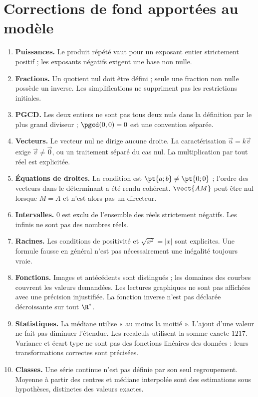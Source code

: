 \section*{Corrections de fond apportées au modèle}
\begin{enumerate}
\item \textbf{Puissances.} Le produit répété vaut pour un exposant entier strictement positif ; les exposants négatifs exigent une base non nulle.
\item \textbf{Fractions.} Un quotient nul doit être défini ; seule une fraction non nulle possède un inverse. Les simplifications ne suppriment pas les restrictions initiales.
\item \textbf{PGCD.} Les deux entiers ne sont pas tous deux nuls dans la définition par le plus grand diviseur ; $\pgcd(0,0)=0$ est une convention séparée.
\item \textbf{Vecteurs.} Le vecteur nul ne dirige aucune droite. La caractérisation $\vec u=k\vec v$ exige $\vec v\ne\vec0$, ou un traitement séparé du cas nul. La multiplication par tout réel est explicitée.
\item \textbf{Équations de droites.} La condition est $\pt{a;b}\ne\pt{0;0}$ ; l'ordre des vecteurs dans le déterminant a été rendu cohérent. $\vect{AM}$ peut être nul lorsque $M=A$ et n'est alors pas un directeur.
\item \textbf{Intervalles.} $0$ est exclu de l'ensemble des réels strictement négatifs. Les infinis ne sont pas des nombres réels.
\item \textbf{Racines.} Les conditions de positivité et $\sqrt{x^2}=|x|$ sont explicites. Une formule fausse en général n'est pas nécessairement une inégalité toujours vraie.
\item \textbf{Fonctions.} Images et antécédents sont distingués ; les domaines des courbes couvrent les valeurs demandées. Les lectures graphiques ne sont pas affichées avec une précision injustifiée. La fonction inverse n'est pas déclarée décroissante sur tout $\R^*$.
\item \textbf{Statistiques.} La médiane utilise « au moins la moitié ». L'ajout d'une valeur ne fait pas diminuer l'étendue. Les recalculs utilisent la somme exacte $1217$. Variance et écart type ne sont pas des fonctions linéaires des données : leurs transformations correctes sont précisées.
\item \textbf{Classes.} Une série continue n'est pas définie par son seul regroupement. Moyenne à partir des centres et médiane interpolée sont des estimations sous hypothèses, distinctes des valeurs exactes.

\end{enumerate}
